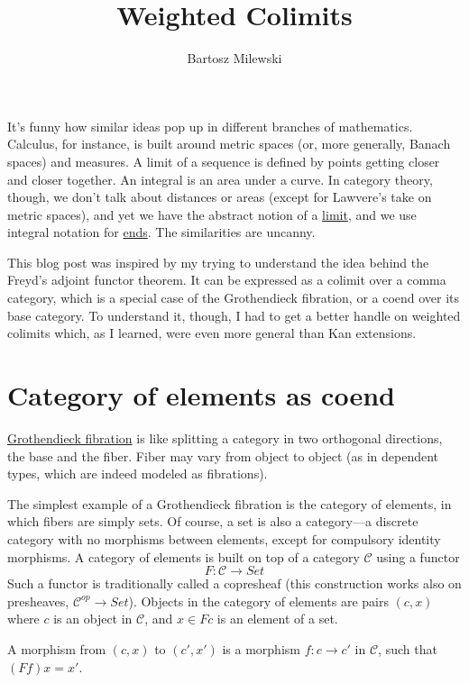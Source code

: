 \documentclass[11pt]{amsart}
\author{Bartosz Milewski}
\title{Weighted Colimits}
\begin{document}
\maketitle{}

It's funny how similar ideas pop up in different branches of mathematics. Calculus, for instance, is built around metric spaces (or, more generally, Banach spaces) and measures. A limit of a sequence is defined by points getting closer and closer together. An integral is an area under a curve. In category theory, though, we don't talk about distances or areas (except for Lawvere's take on metric spaces), and yet we have the abstract notion of a \href{https://bartoszmilewski.com/2015/04/15/limits-and-colimits/}{limit}, and we use integral notation for \href{https://bartoszmilewski.com/2017/03/29/ends-and-coends/}{ends}. The similarities are uncanny. 

This blog post was inspired by my trying to understand the idea behind the Freyd's adjoint functor theorem. It can be expressed as a colimit over a comma category, which is a special case of the Grothendieck fibration, or a coend over its base category. To understand it, though, I had to get a better handle on weighted colimits which, as I learned, were even more general than Kan extensions. 

\section{Category of elements as coend}

\href{https://bartoszmilewski.com/2019/10/09/fibrations-cleavages-and-lenses/}{Grothendieck fibration} is like splitting a category in two orthogonal directions, the base and the fiber. Fiber may vary from object to object (as in dependent types, which are indeed modeled as fibrations). 

The simplest example of a Grothendieck fibration is the category of elements, in which fibers are simply sets. Of course, a set is also a category---a discrete category with no morphisms between elements, except for compulsory identity morphisms. A category of elements is built on top of a category $\mathcal{C}$ using a functor
\[F \colon \mathcal{C} \to Set\]
Such a functor is traditionally called a copresheaf (this construction works also on presheaves, $\mathcal{C}^{op} \to Set$). Objects in the category of elements are pairs $(c, x)$ where $c$ is an object in $\mathcal{C}$, and $x \in F c$ is an element of a set. 

A morphism from $(c, x)$ to $(c', x')$ is a morphism  $f \colon c \to c'$ in $\mathcal{C}$, such that $(F f) x = x'$.
\end{document}
